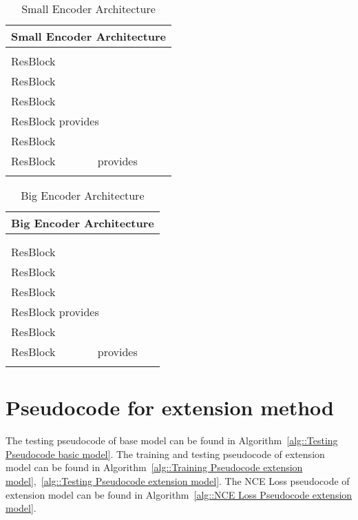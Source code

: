 \documentclass[journal]{IEEEtran}
\theoremstyle{remark}
\begin{document}
\begin{table}[!htb]
 \centering
 \caption{Small Encoder Architecture}\label{tal:small structure}
 \small
\begin{tabular}{l}
\toprule \textbf{Small Encoder Architecture} \\
\hline  \\
ResBlock \\
ResBlock  \\
ResBlock  \\
ResBlock  provides  \\
ResBlock  \\
ResBlock  \ \ \ \ \ \ \  provides  \\
\hline \\
\bottomrule
\end{tabular}
\end{table}

\begin{table}[!htb]
 \centering
 \caption{Big Encoder Architecture}\label{tal:big structure}
 \small
\begin{tabular}{l}
\toprule \textbf{Big Encoder Architecture} \\
\hline  \\
 \\
ResBlock  \\
ResBlock  \\
ResBlock  \\
ResBlock  provides  \\
ResBlock  \\
ResBlock  \ \ \ \ \ \ \  provides  \\
\hline \\
\bottomrule
\end{tabular}
\end{table}

\section{Pseudocode for extension method}
\label{section:Pseudocode for extension method}

The testing pseudocode of base model can be found in Algorithm~\ref{alg::Testing Pseudocode basic model}. The training and testing pseudocode of extension model can be found in Algorithm~\ref{alg::Training Pseudocode extension model},~\ref{alg::Testing Pseudocode extension model}. The NCE Loss pseudocode of extension model can be found in Algorithm~\ref{alg::NCE Loss Pseudocode extension model}.
\end{document}
